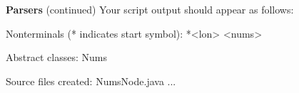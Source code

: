 \begin{minipage}[t]{\sw}
\slidenumber
\LARGE
{\bf Parsers} (continued)\exx
Your script output should appear as follows:
\Large
\begin{qv}
Nonterminals (* indicates start symbol):
 *<lon>
  <nums>

Abstract classes:
  Nums

Source files created:
  NumsNode.java
  ...
\end{qv}

\end{minipage}
\clearpage
